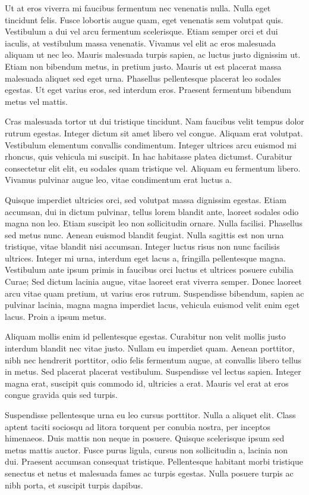 \documentclass[2pt,a4paper,twoside ]{article}
\begin{document}
\begin{multicols}{2}
Ut at eros viverra mi faucibus fermentum nec venenatis nulla. Nulla eget tincidunt felis. Fusce lobortis augue quam, eget venenatis sem volutpat quis. Vestibulum a dui vel arcu fermentum scelerisque. Etiam semper orci et dui iaculis, at vestibulum massa venenatis. Vivamus vel elit ac eros malesuada aliquam ut nec leo. Mauris malesuada turpis sapien, ac luctus justo dignissim ut. Etiam non bibendum metus, in pretium justo. Mauris ut est placerat massa malesuada aliquet sed eget urna. Phasellus pellentesque placerat leo sodales egestas. Ut eget varius eros, sed interdum eros. Praesent fermentum bibendum metus vel mattis.

Cras malesuada tortor ut dui tristique tincidunt. Nam faucibus velit tempus dolor rutrum egestas. Integer dictum sit amet libero vel congue. Aliquam erat volutpat. Vestibulum elementum convallis condimentum. Integer ultrices arcu euismod mi rhoncus, quis vehicula mi suscipit. In hac habitasse platea dictumst. Curabitur consectetur elit elit, eu sodales quam tristique vel. Aliquam eu fermentum libero. Vivamus pulvinar augue leo, vitae condimentum erat luctus a.

Quisque imperdiet ultricies orci, sed volutpat massa dignissim egestas. Etiam accumsan, dui in dictum pulvinar, tellus lorem blandit ante, laoreet sodales odio magna non leo. Etiam suscipit leo non sollicitudin ornare. Nulla facilisi. Phasellus sed metus nunc. Aenean euismod blandit feugiat. Nulla sagittis est non urna tristique, vitae blandit nisi accumsan. Integer luctus risus non nunc facilisis ultrices. Integer mi urna, interdum eget lacus a, fringilla pellentesque magna. Vestibulum ante ipsum primis in faucibus orci luctus et ultrices posuere cubilia Curae; Sed dictum lacinia augue, vitae laoreet erat viverra semper. Donec laoreet arcu vitae quam pretium, ut varius eros rutrum. Suspendisse bibendum, sapien ac pulvinar lacinia, magna magna imperdiet lacus, vehicula euismod velit enim eget lacus. Proin a ipsum metus.

Aliquam mollis enim id pellentesque egestas. Curabitur non velit mollis justo interdum blandit nec vitae justo. Nullam eu imperdiet quam. Aenean porttitor, nibh nec hendrerit porttitor, odio felis fermentum augue, at convallis libero tellus in metus. Sed placerat placerat vestibulum. Suspendisse vel lectus sapien. Integer magna erat, suscipit quis commodo id, ultricies a erat. Mauris vel erat at eros congue gravida quis sed turpis.

Suspendisse pellentesque urna eu leo cursus porttitor. Nulla a aliquet elit. Class aptent taciti sociosqu ad litora torquent per conubia nostra, per inceptos himenaeos. Duis mattis non neque in posuere. Quisque scelerisque ipsum sed metus mattis auctor. Fusce purus ligula, cursus non sollicitudin a, lacinia non dui. Praesent accumsan consequat tristique. Pellentesque habitant morbi tristique senectus et netus et malesuada fames ac turpis egestas. Nulla posuere turpis ac nibh porta, et suscipit turpis dapibus.


\end{multicols}
\end{document}
